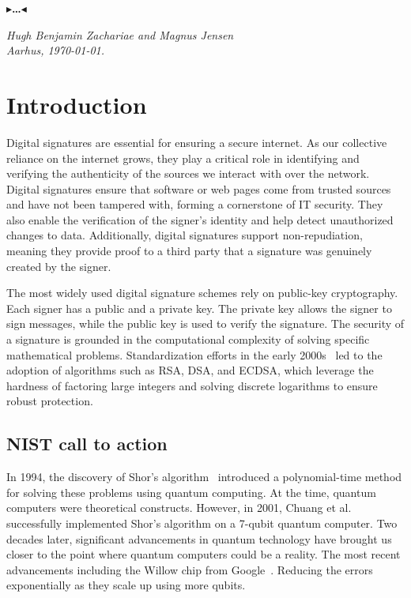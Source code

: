 \documentclass[11pt]{report}
\theoremstyle{definition}
\theoremstyle{plain}
\newcommand{\todo}[1]{{\color[rgb]{.5,0,0}\textbf{$\blacktriangleright$#1$\blacktriangleleft$}}}
\begin{document}
\todo{\dots}

\vspace{2ex}
\begin{flushright}
  \emph{Hugh Benjamin Zachariae and Magnus Jensen}\\
  \emph{Aarhus, \today.}
\end{flushright}

\tableofcontents
\cleardoublepage
{}
\setcounter{secnumdepth}{3}


\chapter{Introduction}\label{ch:intro}

Digital signatures are essential for ensuring a secure internet. As our collective reliance on the internet grows, they play a critical role in identifying and verifying the authenticity of the sources we interact with over the network. Digital signatures ensure that software or web pages come from trusted sources and have not been tampered with, forming a cornerstone of IT security. They also enable the verification of the signer's identity and help detect unauthorized changes to data. Additionally, digital signatures support non-repudiation, meaning they provide proof to a third party that a signature was genuinely created by the signer.

The most widely used digital signature schemes rely on public-key cryptography. Each signer has a public and a private key. The private key allows the signer to sign messages, while the public key is used to verify the signature. The security of a signature is grounded in the computational complexity of solving specific mathematical problems. Standardization efforts in the early 2000s~\cite{pub2000digital} led to the adoption of algorithms such as RSA, DSA, and ECDSA, which leverage the hardness of factoring large integers and solving discrete logarithms to ensure robust protection.

\section{NIST call to action}

In 1994, the discovery of Shor's algorithm~\cite{shor1997} introduced a polynomial-time method for solving these problems using quantum computing. At the time, quantum computers were theoretical constructs. However, in 2001, Chuang et al.~\cite{vandersypen2001experimental,buchmann2004post} successfully implemented Shor's algorithm on a 7-qubit quantum computer. Two decades later, significant advancements in quantum technology have brought us closer to the point where quantum computers could be a reality. The most recent advancements including the Willow chip from Google~\cite{blogMeetWillow}. Reducing the errors exponentially as they scale up using more qubits.
\end{document}
